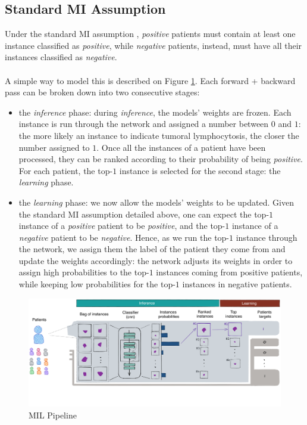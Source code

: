\documentclass[final]{cvpr}
\begin{document}
	\subsection{Standard MI Assumption}
	\label{sec:standardMIL}
	
	Under the standard MI assumption \cite{stdMIL1, stdMIL2}, \emph{positive} patients must contain at least one instance classified as \emph{positive}, while \emph{negative} patients, instead, must have all their instances classified as \emph{negative}.\\
	\\
	A simple way to model this is described on Figure \ref{fig:mil_pipeline}. Each forward + backward pass can be broken down into two consecutive stages: 
	
	\begin{itemize}
		\setlength\itemsep{-.0em}
		\item the \emph{inference} phase: during \emph{inference}, the models' weights are frozen. Each instance is run through the network and assigned a number between $0$ and $1$: the more likely an instance to indicate tumoral lymphocytosis, the closer the number assigned to $1$. Once all the instances of a patient have been processed, they can be ranked according to their probability of being \emph{positive}. For each patient, the top-$1$ instance is selected for the second stage: the \emph{learning} phase.
		\item the \emph{learning} phase: we now allow the models' weights to be updated. Given the standard MI assumption detailed above, one can expect the top-$1$ instance of a \emph{positive} patient to be \emph{positive}, and the top-$1$ instance of a \emph{negative} patient to be \emph{negative}. Hence, as we run the top-$1$ instance through the network, we assign them the label of the patient they come from and update the weights accordingly: the network adjusts its weights in order to assign high probabilities to the top-$1$ instances coming from positive patients, while keeping low probabilities for the top-$1$ instances in negative patients. 
	\end{itemize}

	\begin{figure}[h!]
		\begin{center}
			\includegraphics[width=0.99\linewidth, trim=0cm 5cm 0cm 0cm, clip]{fig/mil_pipeline.pdf}
		\end{center}
		\caption{MIL Pipeline}
		\label{fig:mil_pipeline}
	\end{figure}
\end{document}
